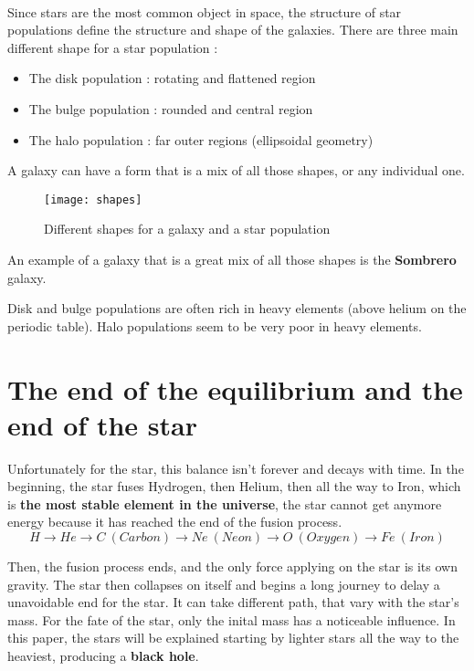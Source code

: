\documentclass[a4paper, 11pt]{article} %
\begin{document}
\paragraph*{}
Since stars are the most common object in space, the structure of star populations define the structure and shape of the galaxies. There are three main different shape for a star population :

\begin{itemize}
 \item The disk population : rotating and flattened region
\item The bulge population : rounded and central region
\item The halo population : far outer regions (ellipsoidal geometry)

\end{itemize}

A galaxy can have a form that is a mix of all those shapes, or any individual one.

\begin{figure}[h]
\centering
\texttt{[image: shapes]}
\caption{Different shapes for a galaxy and a star population}
\end{figure}

An example of a galaxy that is a great mix of all those shapes is the \textbf{Sombrero} galaxy. 

Disk and bulge populations are often rich in heavy elements (above helium on the periodic table). Halo populations seem to be very poor in heavy elements.


\section{The end of the equilibrium and the end of the star}

Unfortunately for the star, this balance isn't forever and decays with time. In the beginning, the star fuses Hydrogen, then Helium, then all the way to Iron, which is \textbf{the most stable element in the universe}, the star cannot get anymore energy because it has reached the end of the fusion process.
\begin{equation}
H \rightarrow He \rightarrow C\ (Carbon) \rightarrow Ne\ (Neon)\rightarrow O\ (Oxygen)\rightarrow Fe\ (Iron)
\end{equation}

Then, the fusion process ends, and the only force applying on the star is its own gravity. The star then collapses on itself and begins a long journey to delay a unavoidable end for the star. It can take different path, that vary with the star's mass. For the fate of the star, only the inital mass has a noticeable influence. In this paper, the stars will be explained starting by lighter stars all the way to the heaviest, producing a \textbf{black hole}.
\end{document}
